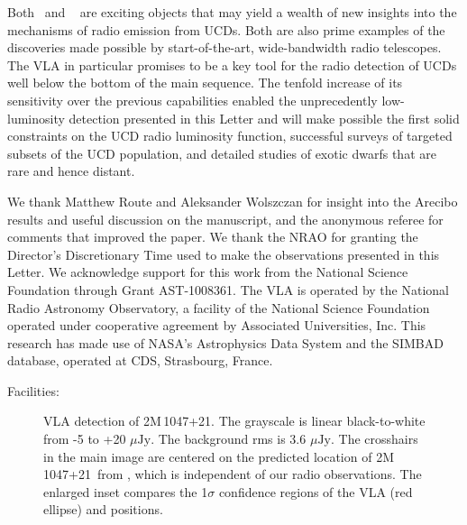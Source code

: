 \documentclass[iop]{emulateapj}
\newcommand\ujy{\ensuremath{\mu\text{Jy}}}
\newcommand\vtwom{2M\,1047+21} %
\newcommand\twom{\object{\vtwom}}
\newcommand\vjthirt{2M\,1315$-$26}
\newcommand\jthirt{\object{\vjthirt}}
\begin{document}
Both \twom\ and \jthirt\ \citep{bmzb13} are exciting objects that may yield a
wealth of new insights into the mechanisms of radio emission from UCDs. Both
are also prime examples of the discoveries made possible by start-of-the-art,
wide-bandwidth radio telescopes. The VLA in particular promises to be a key
tool for the radio detection of UCDs well below the bottom of the main
sequence. The tenfold increase of its sensitivity over the previous
capabilities enabled the unprecedently low-luminosity detection presented in
this Letter and will make possible the first solid constraints on the UCD
radio luminosity function, successful surveys of targeted subsets of the UCD
population, and detailed studies of exotic dwarfs that are rare and hence
distant.

\acknowledgments

We thank Matthew Route and Aleksander Wolszczan for insight into the Arecibo
results and useful discussion on the manuscript, and the anonymous referee for
comments that improved the paper. We thank the NRAO for granting the
Director's Discretionary Time used to make the observations presented in this
Letter. We acknowledge support for this work from the National Science
Foundation through Grant AST-1008361. The VLA is operated by the National
Radio Astronomy Observatory, a facility of the National Science Foundation
operated under cooperative agreement by Associated Universities, Inc. This
research has made use of NASA's Astrophysics Data System and the SIMBAD
database, operated at CDS, Strasbourg, France.

Facilities: 


{}

\begin{figure}[p]
\caption{VLA detection of \vtwom. The grayscale is linear black-to-white from
  -5 to +20 \ujy. The background rms is 3.6 \ujy. The crosshairs in the main
  image are centered on the predicted location of \vtwom\ from \citet{vhl+04},
  which is independent of our radio observations. The enlarged inset compares
  the 1$\sigma$ confidence regions of the VLA (red ellipse) and \citet[blue
    ellipse]{vhl+04} positions.}
\label{f.vlaimg}
\end{figure}
\end{document}
